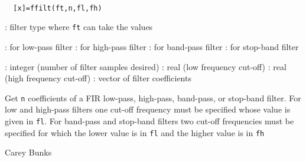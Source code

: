 
\begin{mandesc}
   \\ %
\end{mandesc}
\begin{calling_sequence}
\begin{verbatim}
  [x]=ffilt(ft,n,fl,fh)  
\end{verbatim}
\end{calling_sequence}
\begin{parameters}
  \begin{varlist}
    : filter type where \verb!ft! can take the values
    \begin{varlist}
      : for low-pass filter
      : for high-pass filter
      : for band-pass filter
      : for stop-band filter
    \end{varlist}
    : integer (number of filter samples desired)
    : real (low frequency cut-off)
    : real (high frequency cut-off)
    : vector of filter coefficients
  \end{varlist}
\end{parameters}
\begin{mandescription}
  Get \verb!n! coefficients of a FIR low-pass, high-pass, band-pass, or
  stop-band filter.  For low and high-pass filters one cut-off frequency must be
  specified whose value is given in \verb!fl!. For band-pass and stop-band
  filters two cut-off frequencies must be specified for which the lower value is
  in \verb!fl! and the higher value is in \verb!fh!
\end{mandescription}
\begin{authors}
    Carey Bunks  
\end{authors}
